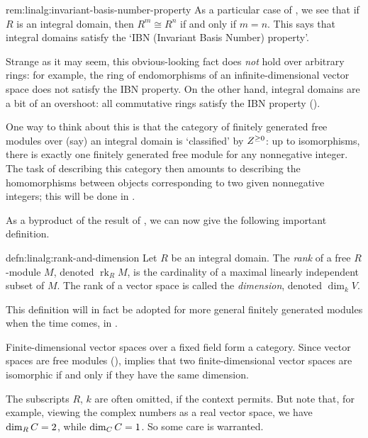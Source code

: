 \begin{rem}{}{rem:linalg:invariant-basis-number-property}
  As a particular case of
  , we see
  that if $R$ is an integral domain, then $R^m \cong R^n$ if and only
  if $m = n$. This says that integral domains satisfy the `IBN
  (Invariant Basis Number) property'.

  Strange as it may seem, this obvious-looking fact does \emph{not}
  hold over arbitrary rings: for example, the ring of endomorphisms of
  an infinite-dimensional vector space does not satisfy the IBN
  property.  On the other hand, integral domains are a bit of an
  overshoot: all commutative rings satisfy the IBN property
  ().
\end{rem}

One way to think about this is that the category of finitely generated
free modules over (say) an integral domain is `classified' by
$Z^{\geq 0}$: up to isomorphisms, there is exactly one finitely
generated free module for any nonnegative integer. The task of
describing this category then amounts to describing the homomorphisms
between objects corresponding to two given nonnegative integers; this
will be done in .

As a byproduct of the result of , we can now give the
following important definition.

\begin{defn}{}{defn:linalg:rank-and-dimension}
  Let $R$ be an integral domain. The \emph{rank} of a free $R$-module
  $M$, denoted $\operatorname{rk}_R M$, is the cardinality of a
  maximal linearly independent subset of $M$. The rank of a vector
  space is called the \emph{dimension}, denoted $\dim_k V$.
\end{defn}

This definition will in fact be adopted for more general finitely
generated modules when the time comes, in
.

Finite-dimensional vector spaces over a fixed field form a category.
Since vector spaces are free modules (),
 implies that two finite-dimensional vector spaces
are isomorphic if and only if they have the same dimension.

The subscripts $R$, $k$ are often omitted, if the context permits. But
note that, for example, viewing the complex numbers as a real vector
space, we have $\dim_{R} C = 2$, while $\dim_{C} C = 1$. So some
care is warranted.

